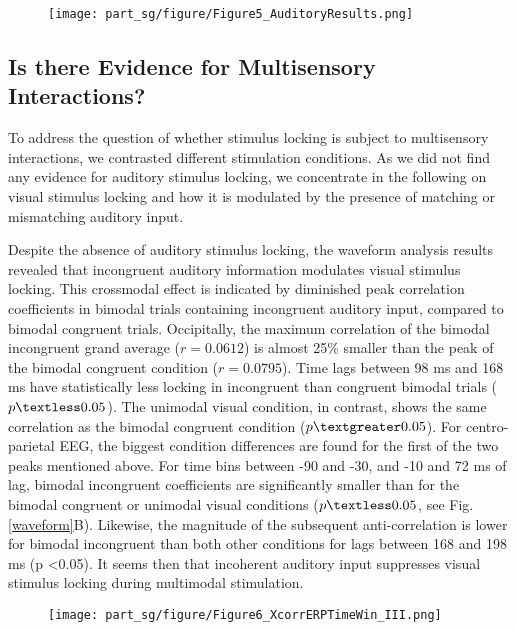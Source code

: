\begin{SCfigure}[][!htb]
\texttt{[image: part\_sg/figure/Figure5\_AuditoryResults.png]}
\caption[No Stimulus Locking to Auditory
Input.]{\protect}\label{audiolock} \end{SCfigure} 



\subsection{Is there Evidence for Multisensory Interactions?}

To address the question of whether stimulus locking is subject to
multisensory interactions, we contrasted different stimulation conditions.
As we did not find any evidence for auditory stimulus locking, we
concentrate in the following on visual stimulus locking and how it is
modulated by the presence of matching or mismatching auditory input. 

Despite the absence of auditory stimulus locking, the waveform analysis
results revealed that incongruent auditory information modulates visual
stimulus locking. This crossmodal effect is indicated by diminished peak
correlation coefficients in bimodal trials containing incongruent auditory
input, compared to bimodal congruent trials. Occipitally, the maximum
correlation of the bimodal incongruent grand average ($r = 0.0612$) is
almost 25\% smaller than the peak of the bimodal congruent condition ($r =
0.0795$).  Time lags between 98 ms and 168 ms have statistically less
locking in incongruent than congruent bimodal trials ($p \textless 0.05$).
The unimodal visual condition, in contrast, shows the same correlation as
the bimodal congruent condition ($p \textgreater 0.05$). For
centro-parietal EEG, the biggest condition differences are found for the
first of the two peaks mentioned above. For time bins between -90 and -30,
and -10 and 72 ms of lag, bimodal incongruent coefficients are
significantly smaller than for the bimodal congruent or unimodal visual
conditions ($p \textless 0.05$, see Fig. \ref{waveform}B). Likewise, the
magnitude of the subsequent anti-correlation is lower for bimodal
incongruent than both other conditions for lags between 168 and 198 ms (p
\textless 0.05). It seems then that incoherent auditory input suppresses
visual stimulus locking during multimodal stimulation.


\begin{SCfigure}[][!htb]
\texttt{[image: part\_sg/figure/Figure6\_XcorrERPTimeWin\_III.png]}
\caption[Temporal Progression of Stimulus
Locking.]{\protect}\label{timelocking} \end{SCfigure} 



